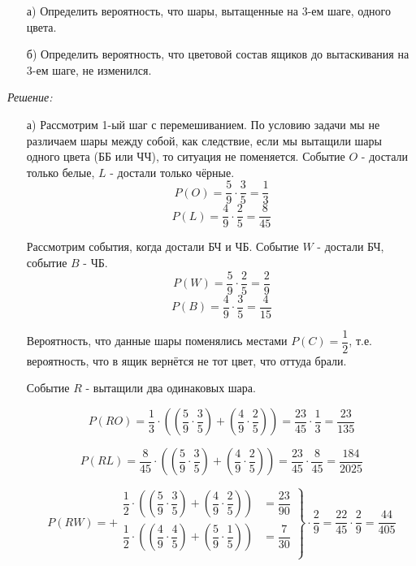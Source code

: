 \begin{enumerate}
	\item [а)] Определить вероятность, что шары, вытащенные на 3-ем шаге, одного цвета.
	\item [б)] Определить вероятность, что цветовой состав ящиков до вытаскивания на 3-ем шаге, не изменился.
\end{enumerate}

\textit{Решение:}

\begin{enumerate}
	\item[а)] Рассмотрим 1-ый шаг с перемешиванием. По условию задачи мы не различаем шары между собой, как следствие, если мы вытащили шары одного цвета (ББ или ЧЧ), то ситуация не поменяется. Событие $O$ - достали только белые, $L$ - достали только чёрные.
	\[ P(O) = \dfrac{5}{9} \cdot \dfrac{3}{5} = \dfrac{1}{3} \]
	\[ P(L) = \dfrac{4}{9} \cdot \dfrac{2}{5} = \dfrac{8}{45} \]
	
	Рассмотрим события, когда достали БЧ и ЧБ. Событие $W$ - достали БЧ, событие $B$ - ЧБ.
	\[ P(W) = \dfrac{5}{9} \cdot \dfrac{2}{5} = \dfrac{2}{9} \]
	\[ P(B) = \dfrac{4}{9} \cdot \dfrac{3}{5} = \dfrac{4}{15} \]
	 
	 Вероятность, что данные шары поменялись местами $P(C) = \dfrac{1}{2}$, т.е. вероятность, что в ящик вернётся не тот цвет, что оттуда брали.
	 
	 Событие $R$ - вытащили два одинаковых шара.
	 
	 \[ P(RO) = \dfrac{1}{3} \cdot \left( \left( \dfrac{5}{9} \cdot \dfrac{3}{5} \right) + \left( \dfrac{4}{9} \cdot \dfrac{2}{5} \right) \right) = \dfrac{23}{45} \cdot \dfrac{1}{3} = \dfrac{23}{135} \]
	 
	 \[ P(RL) = \dfrac{8}{45} \cdot \left( \left( \dfrac{5}{9} \cdot \dfrac{3}{5} \right) + \left( \dfrac{4}{9} \cdot \dfrac{2}{5} \right) \right) = \dfrac{23}{45} \cdot \dfrac{8}{45} = \dfrac{184}{2025} \]
	 
	 \[
	 P(RW) = +
		 \left.
			 \begin{array}{cc}
				 \dfrac{1}{2} \cdot \left( \left( \dfrac{5}{9} \cdot \dfrac{3}{5} \right) + \left( \dfrac{4}{9} \cdot \dfrac{2}{5} \right) \right) & = \dfrac{23}{90} \\
				 \dfrac{1}{2} \cdot \left( \left( \dfrac{4}{9} \cdot \dfrac{4}{5} \right) + \left( \dfrac{5}{9} \cdot \dfrac{1}{5} \right) \right) & = \dfrac{7}{30} \\
			 \end{array}
		 \right\}
	 \cdot \dfrac{2}{9} = \dfrac{22}{45} \cdot \dfrac{2}{9}  = \dfrac{44}{405}
	 \]
	 

\end{enumerate}
